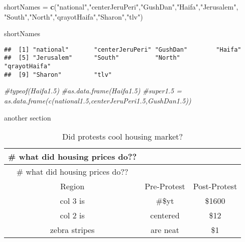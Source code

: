 \documentclass[]{article}
\newenvironment{Shaded}{\begin{snugshade}}{\end{snugshade}}
\newcommand{\KeywordTok}[1]{\textcolor[rgb]{0.13,0.29,0.53}{\textbf{{#1}}}}
\newcommand{\StringTok}[1]{\textcolor[rgb]{0.31,0.60,0.02}{{#1}}}
\newcommand{\CommentTok}[1]{\textcolor[rgb]{0.56,0.35,0.01}{\textit{{#1}}}}
\newcommand{\NormalTok}[1]{{#1}}
\begin{document}
\begin{Shaded}
\begin{Highlighting}[]
\NormalTok{shortNames =}\StringTok{ }\KeywordTok{c}\NormalTok{(}\StringTok{"national"}\NormalTok{,}\StringTok{"centerJeruPeri"}\NormalTok{,}\StringTok{"GushDan"}\NormalTok{,}\StringTok{"Haifa"}\NormalTok{,}\StringTok{"Jerusalem"}\NormalTok{,}
               \StringTok{"South"}\NormalTok{,}\StringTok{"North"}\NormalTok{,}\StringTok{"qrayotHaifa"}\NormalTok{,}\StringTok{"Sharon"}\NormalTok{,}\StringTok{"tlv"}\NormalTok{)}

\NormalTok{shortNames}
\end{Highlighting}
\end{Shaded}

\begin{verbatim}
##  [1] "national"       "centerJeruPeri" "GushDan"        "Haifa"         
##  [5] "Jerusalem"      "South"          "North"          "qrayotHaifa"   
##  [9] "Sharon"         "tlv"
\end{verbatim}

\begin{Shaded}
\begin{Highlighting}[]
\CommentTok{#typeof(Haifa1.5)}
\CommentTok{#as.data.frame(Haifa1.5)}
\CommentTok{#super1.5 = as.data.frame(c(national1.5,centerJeruPeri1.5,GushDan1.5))}
\end{Highlighting}
\end{Shaded}

another section

\begin{longtable}[]{@{}ccc@{}}
\caption{Did protests cool housing market?}\tabularnewline
\toprule
\# what did housing prices do?? & ~ & ~\tabularnewline
\midrule
\endfirsthead
\toprule
\# what did housing prices do?? & ~ & ~\tabularnewline
\midrule
\endhead
Region & Pre-Protest & Post-Protest\tabularnewline
col 3 is & \#\$yt & \$1600\tabularnewline
col 2 is & centered & \$12\tabularnewline
zebra stripes & are neat & \$1\tabularnewline
\bottomrule
\end{longtable}
\end{document}
